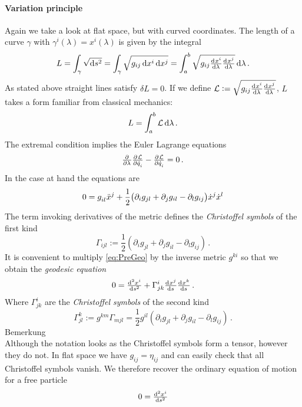\paragraph{Variation principle}
Again we take a look at flat space, but with curved coordinates. 
The length of a curve $\gamma$ with $\gamma^i(\lambda) = x^i(\lambda)$ is given by the integral
\begin{equation}
    L=\int_{\gamma}\sqrt{\dif s^2} = 
    \int_{\gamma}\sqrt{g_{ij}\dif x^i\dif x^j}=\int_{a}^{b}\sqrt{g_{ij}\od{x^i}{\lambda} \od{x^j}{\lambda}}\dif \lambda\, .
\end{equation}
As stated above straight lines satisfy $\delta L = 0$. 
If we define $\mathcal{L}:=\sqrt{g_{ij}\od{x^i}{\lambda} \od{x^j}{\lambda}}$, $L$ takes a form familiar from classical mechanics:
\begin{equation}
    L=\int_a^b \mathcal{L}\dif \lambda\, .
\end{equation}
The extremal condition implies the Euler Lagrange equations
\begin{equation}
    \pd{}{\lambda}\pd{\mathcal{L}}{\dot{q}_i}-\pd{\mathcal{L}}{\dot{q}_i}
=0\, .		\end{equation}
In the case at hand the equations are
\begin{equation}
    0=\tensor{g}{_i_l}\tensor{\ddot{x}}{^j}+\frac{1}{2} \left(\partial_i g_{jl} + \partial_j g_{il} - 
    \partial_l g_{ij}\right)\dot{x}^j\dot{x}^l \label{eq:PreGeo}
\end{equation}
The term invoking derivatives of the metric defines the \emph{Christoffel symbols} of the first kind
\begin{equation}
    \Gamma_{ijl}:=\frac{1}{2} \left(\partial_i g_{jl} + \partial_j g_{il} - \partial_l g_{ij}\right)\, .
\end{equation}
It is convenient to multiply \eqref{eq:PreGeo} by the inverse metric $g^{ki}$ so that we obtain the \emph{geodesic equation}
\begin{equation}
    0 = \od[2]{x^i}{s}+\Gamma^i_{jk}\od{x^j}{s}\od{x^k}{s}\, .
\end{equation}
Where $\Gamma^i_{jk}$ are the \emph{Christoffel symbols} of the second kind
\begin{equation}
    \Gamma^k_{jl}:=g^{km}\Gamma_{mjl}=\frac{1}{2}g^{il}\left(\partial_i g_{jl} + \partial_j g_{il} - \partial_l g_{ij}\right)\, .
\end{equation}
Bemerkung \\
Although the notation looks as the Christoffel symbols form a tensor, however they do not. 
In flat space we have $g_{ij}=\eta_{ij}$ and can easily check that all Christoffel symbols vanish. 
We therefore recover the ordinary equation of motion for a free particle
\begin{equation}
    0 = \od[2]{x^i}{s}
\end{equation}
